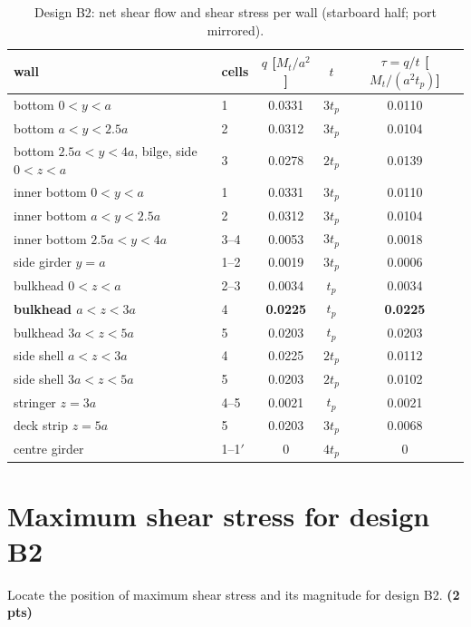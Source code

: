 \begin{table}[htb]
  \centering\small
  \caption{Design B2: net shear flow and shear stress per wall (starboard half; port mirrored).}
  \label{tab:B2walls}
  \begin{tabular}{llccc}
    \toprule
    wall & cells & $q$ [$M_t/a^2$] & $t$ & $\tau=q/t$ [$M_t/(a^2t_p)$] \\
    \midrule
    bottom $0<y<a$ & 1 & 0.0331 & $3t_p$ & 0.0110 \\
    bottom $a<y<2.5a$ & 2 & 0.0312 & $3t_p$ & 0.0104 \\
    bottom $2.5a<y<4a$, bilge, side $0<z<a$ & 3 & 0.0278 & $2t_p$ & 0.0139 \\
    inner bottom $0<y<a$ & 1 & 0.0331 & $3t_p$ & 0.0110 \\
    inner bottom $a<y<2.5a$ & 2 & 0.0312 & $3t_p$ & 0.0104 \\
    inner bottom $2.5a<y<4a$ & 3--4 & 0.0053 & $3t_p$ & 0.0018 \\
    side girder $y=a$ & 1--2 & 0.0019 & $3t_p$ & 0.0006 \\
    bulkhead $0<z<a$ & 2--3 & 0.0034 & $t_p$ & 0.0034 \\
    \textbf{bulkhead $a<z<3a$} & 4 & \textbf{0.0225} & $t_p$ & \textbf{0.0225} \\
    bulkhead $3a<z<5a$ & 5 & 0.0203 & $t_p$ & 0.0203 \\
    side shell $a<z<3a$ & 4 & 0.0225 & $2t_p$ & 0.0112 \\
    side shell $3a<z<5a$ & 5 & 0.0203 & $2t_p$ & 0.0102 \\
    stringer $z=3a$ & 4--5 & 0.0021 & $t_p$ & 0.0021 \\
    deck strip $z=5a$ & 5 & 0.0203 & $3t_p$ & 0.0068 \\
    centre girder & 1--1$'$ & 0 & $4t_p$ & 0 \\
    \bottomrule
  \end{tabular}
\end{table}

\section{Maximum shear stress for design B2}

Locate the position of maximum shear stress and its magnitude for design B2. \textbf{(2 pts)}

